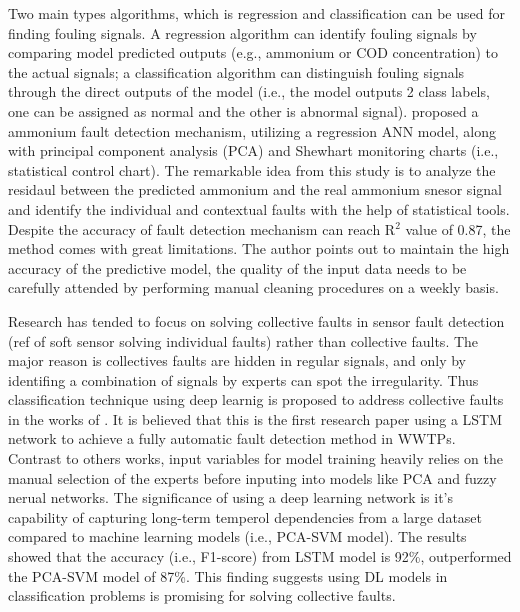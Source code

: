 Two main types algorithms, which is regression and classification can be used for finding fouling signals. A regression algorithm can identify fouling signals by comparing model predicted outputs (e.g., ammonium or COD concentration) to the actual signals; a classification algorithm can distinguish fouling signals through the direct outputs of the model (i.e., the model outputs 2 class labels, one can be assigned as normal and the other is abnormal signal). \citet{cecconiSoftSensingOnLine2021} proposed a ammonium fault detection mechanism, utilizing a regression ANN model, along with principal component analysis (PCA) and Shewhart monitoring charts (i.e., statistical control chart). The remarkable idea from this study is to analyze the residaul between the predicted ammonium and the real ammonium snesor signal and identify the individual and contextual faults with the help of statistical tools. Despite the accuracy of fault detection mechanism can reach R$^2$ value of 0.87, the method comes with great limitations. The author points out to maintain the high accuracy of the predictive model, the quality of the input data needs to be carefully attended by performing manual cleaning procedures on a weekly basis. 

Research has tended to focus on solving collective faults in sensor fault detection (ref of soft sensor solving individual faults) rather than collective faults. The major reason is collectives faults are hidden in regular signals, and only by identifing a combination of signals by experts can spot the irregularity. Thus classification technique using deep learnig is proposed to address collective faults in the works of \citet{mamandipoorMonitoringDetectingFaults2020}. It is believed that this is the first research paper using a LSTM network to achieve a fully automatic fault detection method in WWTPs. Contrast to others works, input variables for model training heavily relies on the manual selection of the experts before inputing into models like PCA and fuzzy nerual networks. The significance of using a deep learning network is it's capability of capturing long-term temperol dependencies from a large dataset compared to machine learning models (i.e., PCA-SVM model). The results showed that the accuracy (i.e., F1-score) from LSTM model is 92\%, outperformed the PCA-SVM model of 87\%. This finding suggests using DL models in classification problems is promising for solving collective faults.

